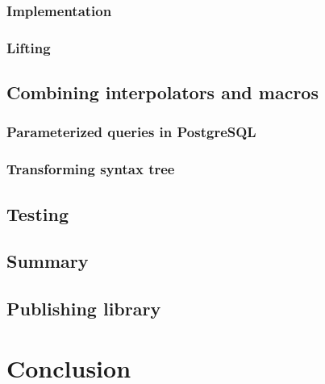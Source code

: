 \documentclass[thesis=B,english]{FITthesis}[2019/12/23]
\begin{document}
\subsection{Implementation}

\subsection{Lifting}

\section{Combining interpolators and macros}

\subsection{Parameterized queries in PostgreSQL}

\subsection{Transforming syntax tree}

\section{Testing}
\section{Summary}

\section{Publishing library}

\chapter{Conclusion}
\end{document}
